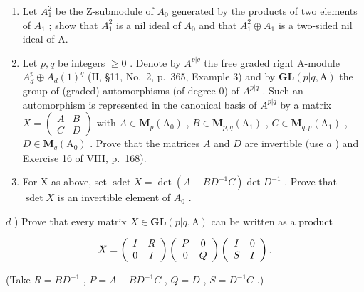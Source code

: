 \begin{enumerate}
\def\labelenumi{\alph{enumi})}
\item
  Let \(A_{1}^{2}\) be the Z-submodule of \(A_{0}\) generated by the products of two elements of \(A_{1}\) ; show that \(A_{1}^{2}\) is a nil ideal of \(A_{0}\) and that \(A_{1}^{2} \oplus A_{1}\) is a two-sided nil ideal of A.
\item
  Let \(p, q\) be integers \(\geqslant 0\) . Denote by \(A^{p|q}\) the free graded right A-module \(A_d^p \oplus A_d(1)^q\) (II, §11, No.~2, p.~365, Example 3) and by \(\mathbf{GL}(p|q, \mathrm{A})\) the group of (graded) automorphisms (of degree 0) of \(A^{p|q}\) . Such an automorphism is represented in the canonical basis of \(A^{p|q}\) by a matrix \(X = \begin{pmatrix} A & B \\ C & D \end{pmatrix}\) with \(A \in \mathbf{M}_p(\mathrm{A}_0)\) , \(B \in \mathbf{M}_{p,q}(\mathrm{A}_1)\) , \(C \in \mathbf{M}_{q,p}(\mathrm{A}_1)\) , \(D \in \mathbf{M}_q(\mathrm{A}_0)\) . Prove that the matrices \(A\) and \(D\) are invertible (use \(a\) ) and Exercise 16 of VIII, p.~168).
\item
  For X as above, set \(\operatorname{sdet} X = \det(A - BD^{-1}C) \det D^{-1}\) . Prove that \(\operatorname{sdet} X\) is an invertible element of \(A_{0}\) .
\end{enumerate}

\(d\) ) Prove that every matrix \(X\in \mathbf{GL}(p|q,\mathrm{A})\) can be written as a product

\[
X = \left( \begin{array}{c c} I & R \\ 0 & I \end{array} \right) \left( \begin{array}{c c} P & 0 \\ 0 & Q \end{array} \right) \left( \begin{array}{c c} I & 0 \\ S & I \end{array} \right).
\]

(Take \(R = BD^{-1}\) , \(P = A - BD^{-1}C\) , \(Q = D\) , \(S = D^{-1}C\) .)

